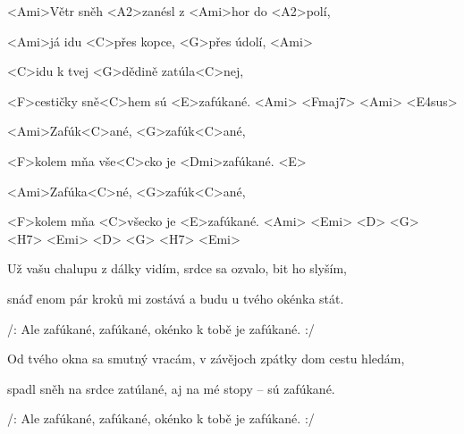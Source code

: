 





\zs
<Ami>Větr sněh <A2>zanésl z <Ami>hor do <A2>polí,

<Ami>já idu <C>přes kopce, <G>přes údolí, <Ami>

<C>idu k tvej <G>dědině zatúla<C>nej,

<F>cestičky sně<C>hem sú <E>zafúkané. <Ami> <Fmaj7> 
<Ami> <E4sus>
\ks

\zr
<Ami>Zafúk<C>ané, <G>zafúk<C>ané,

<F>kolem mňa vše<C>cko je <Dmi>zafúkané. <E>

<Ami>Zafúka<C>né, <G>zafúk<C>ané,

<F>kolem mňa <C>všecko je <E>zafúkané. <Ami> <Emi> 
<D> <G> <H7> <Emi> <D> <G> <H7> <Emi>
\kr

\zs
Už vašu chalupu z dálky vidím, srdce sa ozvalo, bit ho slyším,

snáď enom pár kroků mi zostává a budu u tvého okénka stát.
\ks

\zr
/: Ale zafúkané, zafúkané, okénko k tobě je zafúkané. :/
\kr

\zs
Od tvého okna sa smutný vracám, v závějoch zpátky dom cestu hledám,

spadl sněh na srdce zatúlané, aj na mé stopy -- sú zafúkané.
\ks

\zr
/: Ale zafúkané, zafúkané, okénko k tobě je zafúkané. :/
\kr







\kp
























